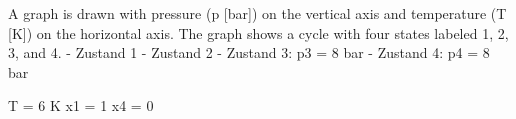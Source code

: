 A graph is drawn with pressure (p [bar]) on the vertical axis and temperature (T [K]) on the horizontal axis. The graph shows a cycle with four states labeled 1, 2, 3, and 4.  
- Zustand 1  
- Zustand 2  
- Zustand 3: p3 = 8 bar  
- Zustand 4: p4 = 8 bar  

T = 6 K  
x1 = 1  
x4 = 0